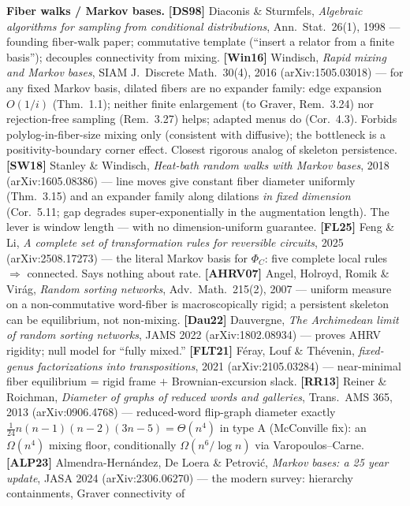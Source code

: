 \documentclass[11pt]{article}
\begin{document}
\textbf{Fiber walks / Markov bases.}
\textbf{[DS98]} Diaconis \& Sturmfels, \emph{Algebraic algorithms for sampling from conditional
distributions}, Ann.\ Stat.\ 26(1), 1998 --- founding fiber-walk paper; commutative template
(``insert a relator from a finite basis''); decouples connectivity from mixing.
\textbf{[Win16]} Windisch, \emph{Rapid mixing and Markov bases}, SIAM J.\ Discrete Math.\ 30(4), 2016
(arXiv:1505.03018) --- for any fixed Markov basis, dilated fibers are no expander family: edge expansion
$O(1/i)$ (Thm.~1.1); neither finite enlargement (to Graver, Rem.~3.24) nor rejection-free sampling
(Rem.~3.27) helps; adapted menus do (Cor.~4.3). Forbids polylog-in-fiber-size mixing only (consistent
with diffusive); the bottleneck is a positivity-boundary corner effect. Closest rigorous analog of
skeleton persistence.
\textbf{[SW18]} Stanley \& Windisch, \emph{Heat-bath random walks with Markov bases}, 2018
(arXiv:1605.08386) --- line moves give constant fiber diameter uniformly (Thm.~3.15) and an expander
family along dilations \emph{in fixed dimension} (Cor.~5.11; gap degrades super-exponentially in the
augmentation length). The lever is window length --- with no dimension-uniform guarantee.
\textbf{[FL25]} Feng \& Li, \emph{A complete set of transformation rules for reversible circuits}, 2025
(arXiv:2508.17273) --- the literal Markov basis for $\Phi_C$: five complete local rules $\Rightarrow$
connected. Says nothing about rate.
\textbf{[AHRV07]} Angel, Holroyd, Romik \& Vir\'ag, \emph{Random sorting networks}, Adv.\ Math.\
215(2), 2007 --- uniform measure on a non-commutative word-fiber is macroscopically rigid; a persistent
skeleton can be equilibrium, not non-mixing.
\textbf{[Dau22]} Dauvergne, \emph{The Archimedean limit of random sorting networks}, JAMS 2022
(arXiv:1802.08934) --- proves AHRV rigidity; null model for ``fully mixed.''
\textbf{[FLT21]} F\'eray, Louf \& Th\'evenin, \emph{fixed-genus factorizations into transpositions},
2021 (arXiv:2105.03284) --- near-minimal fiber equilibrium = rigid frame $+$ Brownian-excursion slack.
\textbf{[RR13]} Reiner \& Roichman, \emph{Diameter of graphs of reduced words and galleries}, Trans.\ AMS 365,
2013 (arXiv:0906.4768) --- reduced-word flip-graph diameter exactly $\frac{1}{24}n(n-1)(n-2)(3n-5)
= \Theta(n^4)$ in type A (McConville fix): an $\Omega(n^4)$ mixing floor, conditionally
$\Omega(n^6/\log n)$ via Varopoulos--Carne.
\textbf{[ALP23]} Almendra-Hern\'andez, De Loera \& Petrovi\'c, \emph{Markov bases: a 25 year update},
JASA 2024 (arXiv:2306.06270) --- the modern survey: hierarchy containments, Graver connectivity of
\end{document}
